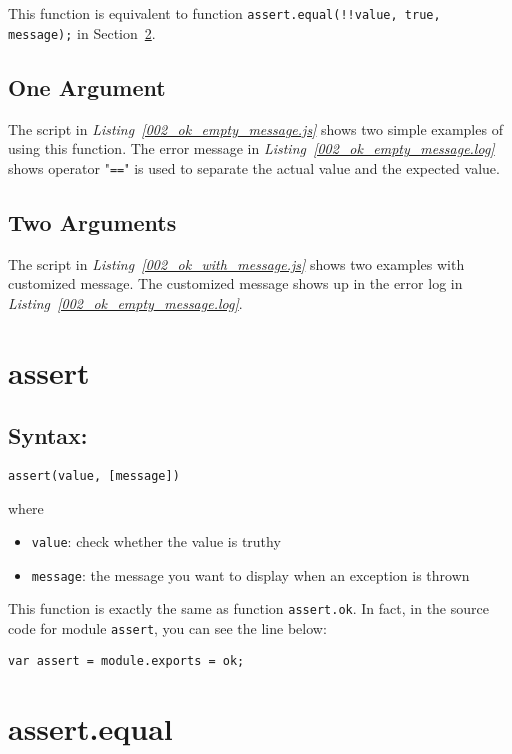 This function is equivalent to function \texttt{assert.equal(!!value, true, message);} in Section~\ref{sec:assert.equal}.
\subsection{One Argument}
The script in \textit{Listing~\ref{002_ok_empty_message.js}} shows two simple examples of using this function. The error message in \textit{Listing~\ref{002_ok_empty_message.log}} shows operator "\texttt{==}" is used to separate the actual value and the expected value.


\subsection{Two Arguments}
The script in \textit{Listing~\ref{002_ok_with_message.js}} shows two examples with customized message. The customized message shows up in the error log in \textit{Listing~\ref{002_ok_empty_message.log}}.


\section{assert}
\subsection*{Syntax:}
\begin{center}\texttt{assert(value, [message])}

\end{center}where
\begin{itemize}
\item \texttt{value}: check whether the value is truthy
\item \texttt{message}: the message you want to display when an exception is thrown
\end{itemize}

This function is exactly the same as function \texttt{assert.ok}. In fact, in the source code for module \texttt{assert}, you can see the line below:

\lstinline$var assert = module.exports = ok;$
\section{assert.equal}
\label{sec:assert.equal}
